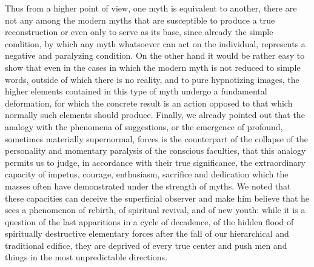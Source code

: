 Thus from a higher point of view, one myth is equivalent to another, there are not any among the modern myths that are susceptible to produce a true reconstruction or even only to serve as its base, since already the simple condition, by which any myth whatsoever can act on the individual, represents a negative and paralyzing condition. On the other hand it would be rather easy to show that even in the cases in which the modern myth is not reduced to simple words, outside of which there is no reality, and to pure hypnotizing images, the higher elements contained in this type of myth undergo a fundamental deformation, for which the concrete result is an action opposed to that which normally such elements should produce. Finally, we already pointed out that the analogy with the phenomena of suggestions, or the emergence of profound, sometimes materially supernormal, forces is the counterpart of the collapse of the personality and momentary paralysis of the conscious faculties, that this analogy permits us to judge, in accordance with their true significance, the extraordinary capacity of impetus, courage, enthusiasm, sacrifice and dedication which the masses often have demonstrated under the strength of myths. We noted that these capacities can deceive the superficial observer and make him believe that he sees a phenomenon of rebirth, of spiritual revival, and of new youth: while it is a question of the last apparitions in a cycle of decadence, of the hidden flood of spiritually destructive elementary forces after the fall of our hierarchical and traditional edifice, they are deprived of every true center and push men and things in the most unpredictable directions.

